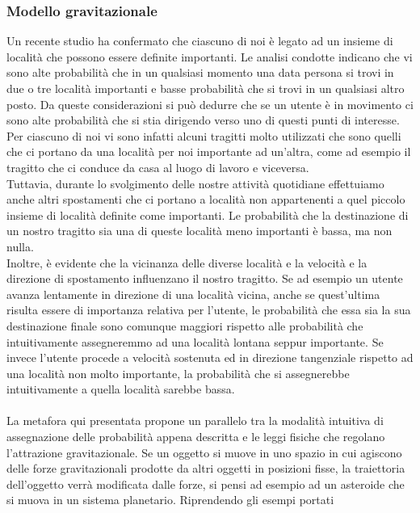 \subsubsection{Modello gravitazionale}
Un recente studio \cite{cit_44} ha confermato che ciascuno di noi \`e legato ad un
insieme di localit\`a che possono essere definite importanti. Le analisi condotte
indicano che vi sono alte probabilit\`a che in un qualsiasi momento una data
persona si trovi in due o tre localit\`a importanti e basse probabilit\`a che si trovi
in un qualsiasi altro posto. Da queste considerazioni si pu\`o dedurre che se un
utente \`e in movimento ci sono alte probabilit\`a che si stia dirigendo verso uno
di questi punti di interesse. Per ciascuno di noi vi sono infatti alcuni tragitti
molto utilizzati che sono quelli che ci portano da una localit\`a per noi importante
ad un'altra, come ad esempio il tragitto che ci conduce da casa al luogo
di lavoro e viceversa.\\
Tuttavia, durante lo svolgimento delle nostre attivit\`a quotidiane effettuiamo
anche altri spostamenti che ci portano a localit\`a non appartenenti a quel piccolo
insieme di localit\`a definite come importanti. Le probabilit\`a che la destinazione
di un nostro tragitto sia una di queste localit\`a meno importanti \`e bassa, ma
non nulla.\\
Inoltre, \`e evidente che la vicinanza delle diverse localit\`a e la velocit\`a e la direzione
di spostamento influenzano il nostro tragitto. Se ad esempio un utente
avanza lentamente in direzione di una localit\`a vicina, anche se quest'ultima
risulta essere di importanza relativa per l'utente, le probabilit\`a che essa sia la
sua destinazione finale sono comunque maggiori rispetto alle probabilit\`a che
intuitivamente assegneremmo ad una localit\`a lontana seppur importante. Se
invece l'utente procede a velocit\`a sostenuta ed in direzione tangenziale rispetto
ad una localit\`a non molto importante, la probabilit\`a che si assegnerebbe
intuitivamente a quella localit\`a sarebbe bassa.\\
\\
La metafora qui presentata propone un parallelo tra la modalit\`a intuitiva
di assegnazione delle probabilit\`a appena descritta e le leggi fisiche che regolano
l'attrazione gravitazionale. Se un oggetto si muove in uno spazio in cui agiscono
delle forze gravitazionali prodotte da altri oggetti in posizioni fisse, la
traiettoria dell'oggetto verr\`a modificata dalle forze, si pensi ad esempio ad un
asteroide che si muova in un sistema planetario. Riprendendo gli esempi portati

